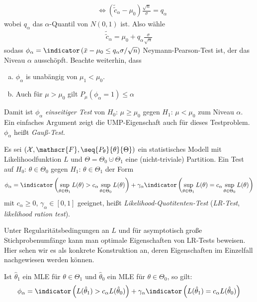 \documentclass[a4paper]{scrartcl}
\begin{document}
\begin{example}
\begin{align*}
				&\Leftrightarrow \left(\tilde{\tilde{c}}_\alpha-\mu_0\right)\frac{\sqrt{n}}{\sigma}=q_\alpha
			\end{align*}
			wobei $q_\alpha$ das $\alpha$-Quantil von $N(0,1)$ ist. Also wähle
			\begin{align*}
				\tilde{\tilde{c}}_\alpha=\mu_0+q_\alpha\frac{\sigma}{\sqrt{n}}
			\end{align*}
			sodass $\phi_\alpha=\indicator\left(\bar{x}-\mu_0\le q_\alpha\sigma/\sqrt{n}\right)$ Neymann-Pearson-Test ist, der das Niveau $\alpha$ ausschöpft. Beachte weiterhin, dass
			\begin{enumerate}[a)]
				\item $\phi_\alpha$ is unabängig von $\mu_1<\mu_0$.
				\item Auch für $\mu>\mu_0$ gilt $P_\mu(\phi_\alpha=1)\le\alpha$
			\end{enumerate}
			Damit ist $\phi_\alpha$ \emph{einseitiger Test} von $H_0$: $\mu\ge\mu_0$ gegen $H_1$: $\mu<\mu_0$ zum Niveau $\alpha$. Ein einfaches Argument zeigt die UMP-Eigenschaft auch für dieses Testproblem. $\phi_\alpha$ heißt \emph{Gauß-Test}.
		\end{example}
		\begin{definition}
			Es sei $\left(\mathcal{X},\mathscr{F},\seq{P_\theta}{\theta}{\Theta}\right)$ ein statistisches Modell mit Likelihoodfunktion $L$ und $\Theta=\Theta_0\cupdot\Theta_1$ eine (nicht-triviale) Partition. Ein Test auf $H_0$: $\theta\in\Theta_0$ gegen $H_1$: $\theta\in\Theta_1$ der Form
			\begin{align*}
				\phi_\alpha=\indicator\left(\sup_{\theta\in\Theta_1}L(\theta)>c_\alpha \sup_{\theta\in\Theta_0}L(\theta)\right)+\gamma_\alpha \indicator\left(\sup_{\theta\in\Theta_1}L(\theta)=c_\alpha \sup_{\theta\in\Theta_0}L(\theta)\right)
			\end{align*}
			mit $c_\alpha\ge 0$, $\gamma_\alpha\in[0,1]$ geeignet, heißt \emph{Likelihood-Quotitenten-Test} (\emph{LR-Test}, \emph{likelihood ration test}).
		\end{definition}
		\begin{remark}
			Unter Regularitätsbedingungen an $L$ und für asymptotisch große Stichprobenumfänge kann man optimale Eigenschaften von LR-Tests beweisen. Hier sehen wir es als konkrete Konstruktion an, deren Eigenschaften im Einzelfall nachgewiesen werden können.
			
			Ist $\hat{\theta}_1$ ein MLE für $\theta\in\Theta_1$ und $\hat{\theta}_0$ ein MLE für $\theta\in\Theta_0$, so gilt:
			\begin{align*}
				\phi_\alpha=\indicator\left(L(\hat{\theta}_1)>c_\alpha L(\hat{\theta}_0)\right)+\gamma_\alpha \indicator\left(L(\hat{\theta}_1)=c_\alpha L(\hat{\theta}_0)\right)
			\end{align*}
		\end{remark}
\end{document}
